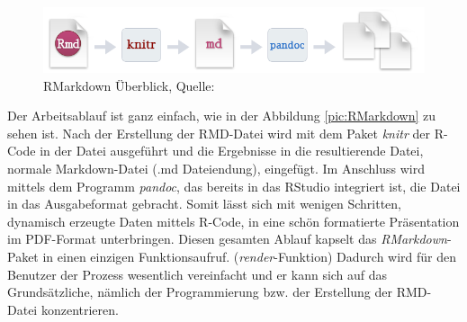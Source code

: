 \begin{figure}
\centering
\includegraphics[width=\ScaleIfNeeded]{pictures/RMarkdown}
\caption{RMarkdown Überblick, Quelle: \cite{rmarkdown}}
\label{pic:RStudio}
\end{figure}
Der Arbeitsablauf ist ganz einfach, wie in der Abbildung \ref{pic:RMarkdown} zu sehen ist. Nach der Erstellung der RMD-Datei wird mit dem Paket \emph{knitr} der R-Code in der Datei ausgeführt und die Ergebnisse in die resultierende Datei, normale Markdown-Datei (.md Dateiendung), eingefügt. Im Anschluss wird mittels dem Programm \emph{pandoc}, das bereits in das RStudio integriert ist, die Datei in das Ausgabeformat gebracht. Somit lässt sich mit wenigen Schritten, dynamisch erzeugte Daten mittels R-Code, in eine schön formatierte Präsentation im PDF-Format unterbringen. Diesen gesamten Ablauf kapselt das \emph{RMarkdown}-Paket in einen einzigen Funktionsaufruf. (\emph{render}-Funktion) Dadurch wird für den Benutzer der Prozess wesentlich vereinfacht und er kann sich auf das Grundsätzliche, nämlich der Programmierung bzw. der Erstellung der RMD-Datei konzentrieren. \cite{rmarkdown}